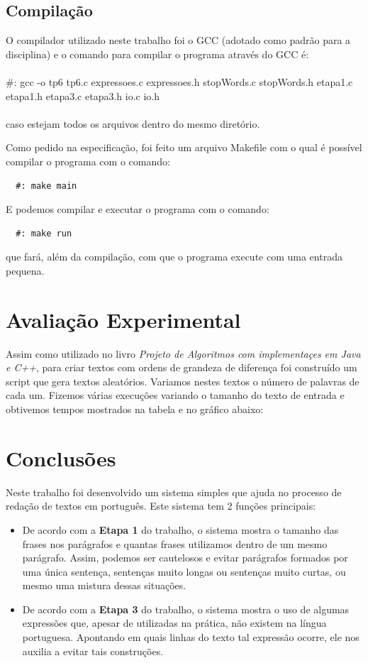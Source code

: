 \documentclass[12pt]{article}
\begin{document}
\subsection{Compilação}
O compilador utilizado neste trabalho foi o GCC (adotado como padrão para a disciplina) e 
o comando para compilar o programa através do GCC é:\\
\\
\#: gcc -o tp6 tp6.c expressoes.c expressoes.h stopWords.c stopWords.h etapa1.c etapa1.h etapa3.c etapa3.h io.c io.h\\
\\
caso estejam todos os arquivos dentro do mesmo diretório.

Como pedido na especificação, foi feito um arquivo Makefile com o qual é possível compilar
o programa com o comando: 
\begin{verbatim}
  #: make main
\end{verbatim}

E podemos compilar e executar o programa com o comando:
\begin{verbatim}
  #: make run
\end{verbatim}
que fará, além da compilação, com que o programa execute com uma entrada pequena.

\section{Avaliação Experimental}
\label{avaliacao_experimental}
Assim como utilizado no livro \textit{Projeto de Algoritmos com implementaçes em Java e C++}, para criar textos com ordens de grandeza de diferença foi construído um script que gera textos aleatórios. Variamos nestes textos o número de palavras de cada um. Fizemos várias execuções variando o tamanho do texto de entrada e obtivemos tempos mostrados na tabela e no gráfico abaixo:



\section{Conclusões}
\label{conclusao}
Neste trabalho foi desenvolvido um sistema simples que ajuda no processo de redação de textos em português. Este sistema tem 2 funções principais:
\begin{itemize}
  \item De acordo com a \textbf{Etapa 1} do trabalho, o sistema mostra o tamanho das frases nos parágrafos e quantas frases utilizamos dentro de um mesmo parágrafo. Assim, podemos ser cautelosos e evitar parágrafos formados por uma única sentença, sentenças muito longas ou sentenças muito curtas, ou mesmo uma mistura dessas situações.
  \item De acordo com a \textbf{Etapa 3} do trabalho, o sistema mostra o uso de algumas expressões que, apesar de utilizadas na prática, não existem na língua portuguesa. Apontando em quais linhas do texto tal expressão ocorre, ele nos auxilia a evitar tais construções.
\end{itemize}
\end{document}
